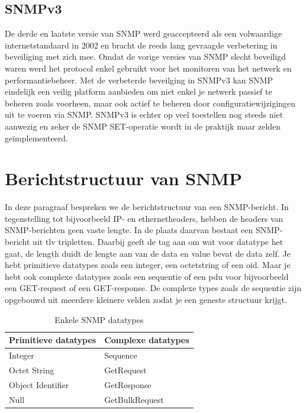 

\subsection{SNMPv3}
De derde en laatste versie van SNMP werd geaccepteerd als een volwaardige internetstandaard in 2002 \cite{snmpv3} en
bracht de reeds lang gevraagde verbetering in beveiliging met zich mee.
Omdat de vorige versies van SNMP slecht beveiligd waren werd het protocol enkel gebruikt voor het monitoren van het netwerk en performantiebeheer.
Met de verbeterde beveilging in SNMPv3 kan SNMP eindelijk een veilig platform aanbieden om niet enkel je netwerk passief te beheren zoals voorheen,
maar ook actief te beheren door configuratiewijzigingen uit te voeren via SNMP.
SNMPv3 is echter op veel toestellen nog steeds niet aanwezig en zeker de SNMP SET-operatie wordt in de praktijk maar zelden geïmplementeerd.

\section{Berichtstructuur van SNMP}
\label{snmp-berichtstructuur}

In deze paragraaf bespreken we de berichtstructuur van een SNMP-bericht.
In tegenstelling tot bijvoorbeeld IP- en ethernetheaders, hebben de headers van SNMP-berichten geen vaste lengte.
In de plaats daarvan bestaat een SNMP-bericht uit \gls{tlv} tripletten\cite{moreau}.
Daarbij geeft de tag aan om wat voor datatype het gaat, de length duidt de lengte aan van de data en value bevat de data zelf.
Je hebt primitieve datatypes zoals een integer, een octetstring of een \gls{oid}.
Maar je hebt ook complexe datatypes zoals een sequentie of een \gls{pdu} voor bijvoorbeeld een GET-request of een GET-response.
De complexe types zoals de sequentie zijn opgebouwd uit meerdere kleinere velden zodat je een geneste structuur krijgt\cite{snmp-message-format}.

\begin{table}[h]
\centering
\begin{tabular}{@{}ll@{}}
\toprule
Primitieve datatypes & Complexe datatypes \\ \midrule
Integer              & Sequence           \\
Octet String         & GetRequest         \\
Object Identifier    & GetResponse        \\
Null                 & GetBulkRequest     \\ \bottomrule
\end{tabular}
\caption{Enkele SNMP datatypes}
\label{tabel-datatypes}
\end{table}

